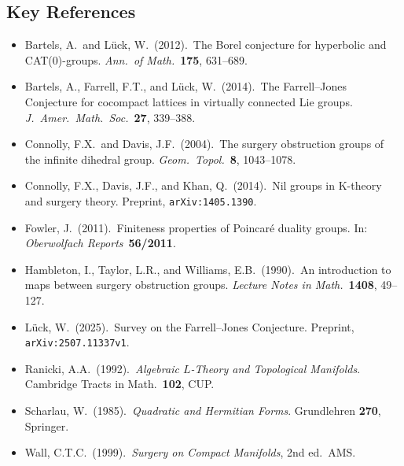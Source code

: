 \subsection*{Key References}
\begin{itemize}
\item Bartels, A.\ and L\"uck, W.\ (2012).\ The Borel conjecture for
  hyperbolic and CAT(0)-groups.
  \emph{Ann.\ of Math.}\ \textbf{175}, 631--689.
\item Bartels, A., Farrell, F.T., and L\"uck, W.\ (2014).\ The
  Farrell--Jones Conjecture for cocompact lattices in virtually connected
  Lie groups.
  \emph{J.\ Amer.\ Math.\ Soc.}\ \textbf{27}, 339--388.
\item Connolly, F.X.\ and Davis, J.F.\ (2004).\ The surgery obstruction
  groups of the infinite dihedral group.
  \emph{Geom.\ Topol.}\ \textbf{8}, 1043--1078.
\item Connolly, F.X., Davis, J.F., and Khan, Q.\ (2014).\ Nil groups
  in K-theory and surgery theory.
  Preprint, \texttt{arXiv:1405.1390}.
\item Fowler, J.\ (2011).\ Finiteness properties of Poincar\'e duality groups.
  In: \emph{Oberwolfach Reports}\ \textbf{56/2011}.
\item Hambleton, I., Taylor, L.R., and Williams, E.B.\ (1990).\ An introduction
  to maps between surgery obstruction groups.
  \emph{Lecture Notes in Math.}\ \textbf{1408}, 49--127.
\item L\"uck, W.\ (2025).\ Survey on the Farrell--Jones Conjecture.
  Preprint, \texttt{arXiv:2507.11337v1}.
\item Ranicki, A.A.\ (1992).\ \emph{Algebraic $L$-Theory and Topological
  Manifolds}. Cambridge Tracts in Math.\ \textbf{102}, CUP.
\item Scharlau, W.\ (1985).\ \emph{Quadratic and Hermitian Forms}.
  Grundlehren \textbf{270}, Springer.
\item Wall, C.T.C.\ (1999).\ \emph{Surgery on Compact Manifolds},
  2nd ed.\ AMS.
\end{itemize}
